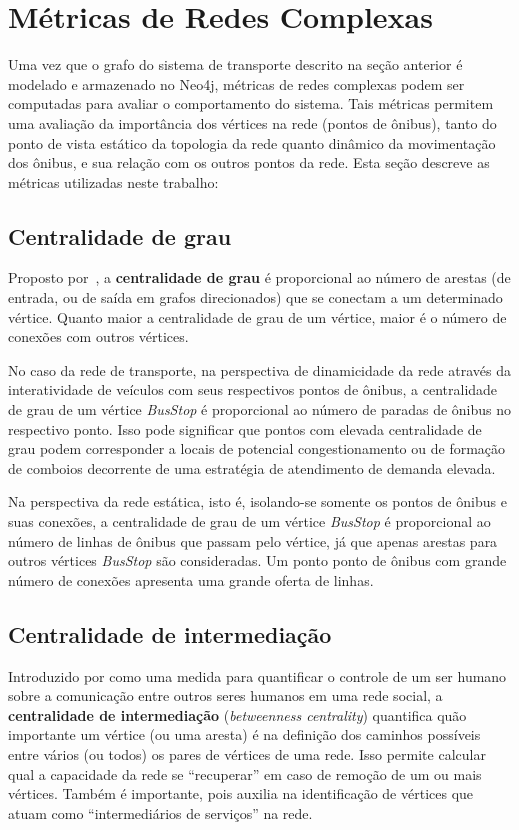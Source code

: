 \section{Métricas de Redes Complexas} \label{sec:metr}


Uma vez que o grafo do sistema de transporte descrito na seção anterior é modelado e armazenado no Neo4j, métricas de redes complexas podem ser computadas para avaliar o comportamento do sistema. 
Tais métricas permitem uma avaliação da importância dos vértices na rede (pontos de ônibus), tanto do ponto de vista estático da topologia da rede quanto dinâmico da movimentação dos ônibus, e sua relação com os outros pontos da rede.
Esta seção descreve as métricas utilizadas neste trabalho: 

\subsection{Centralidade de grau}


Proposto por~\cite{free:79}, a {\bf centralidade de grau} é proporcional ao número de arestas (de entrada, ou de saída em grafos direcionados) que se conectam a um determinado vértice. Quanto maior a centralidade de grau de um vértice, maior é o número de conexões com outros vértices.

No caso da rede de transporte, na perspectiva de dinamicidade da rede através da interatividade de veículos com seus respectivos pontos de ônibus, a centralidade de grau de um vértice \emph{BusStop} é proporcional ao número de paradas de ônibus no respectivo ponto. Isso pode significar que pontos com elevada centralidade de grau podem corresponder a locais de potencial congestionamento ou de formação de comboios decorrente de uma estratégia de atendimento de demanda elevada. 

Na perspectiva da rede estática, isto é, isolando-se somente os pontos de ônibus e suas conexões, a centralidade de grau de um vértice \emph{BusStop} é proporcional ao número de linhas de ônibus que passam pelo vértice, já que apenas arestas para outros vértices \emph{BusStop} são consideradas. Um ponto ponto de ônibus com grande número de conexões apresenta uma grande oferta de linhas.

\subsection{Centralidade de intermediação}


Introduzido por \cite{free:77} como uma medida para quantificar o controle de um ser humano sobre a comunicação entre outros seres humanos em uma rede social, a {\bf centralidade de intermediação} (\emph{betweenness centrality}) quantifica quão importante um vértice (ou uma aresta) é na definição dos caminhos possíveis entre vários (ou todos) os pares de vértices de uma rede. Isso permite calcular qual a capacidade da rede se ``recuperar'' em caso de remoção de um ou mais vértices. Também é importante, pois auxilia na identificação de vértices que atuam como ``intermediários de serviços'' na rede.

